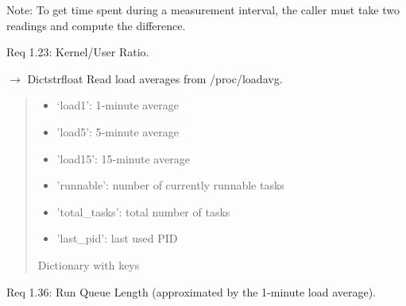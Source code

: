 \documentclass[letterpaper,10pt,english]{sphinxmanual}
\begin{document}
\begin{fulllineitems}
\begin{fulllineitems}
\begin{quote}
\begin{description}
\end{description}\end{quote}

\sphinxAtStartPar
Note: To get time spent during a measurement interval, the caller must
take two readings and compute the difference.

\sphinxAtStartPar
Req 1.23: Kernel/User Ratio.

\end{fulllineitems}


\begin{fulllineitems}
\label{\detokenize{core.readers.scheduler_monitor:core.readers.scheduler_monitor.SchedulerMonitor.read_loadavg}}
\pysigstartsignatures
\pysiglinewithargsret
{}
{}
{{ $\rightarrow$ Dict\DUrole{p}{{[}}strfloat\DUrole{p}{{]}}}}
\pysigstopsignatures
\sphinxAtStartPar
Read load averages from /proc/loadavg.
\begin{quote}\begin{description}
\sphinxAtStartPar
\begin{itemize}
\item {} 
\sphinxAtStartPar
‘load1’: 1‑minute average

\item {} 
\sphinxAtStartPar
’load5’: 5‑minute average

\item {} 
\sphinxAtStartPar
’load15’: 15‑minute average

\item {} 
\sphinxAtStartPar
’runnable’: number of currently runnable tasks

\item {} 
\sphinxAtStartPar
’total\_tasks’: total number of tasks

\item {} 
\sphinxAtStartPar
’last\_pid’: last used PID

\end{itemize}


\sphinxAtStartPar
Dictionary with keys

\end{description}\end{quote}

\sphinxAtStartPar
Req 1.36: Run Queue Length (approximated by the 1‑minute load average).


\end{fulllineitems}
\end{fulllineitems}
\end{document}
